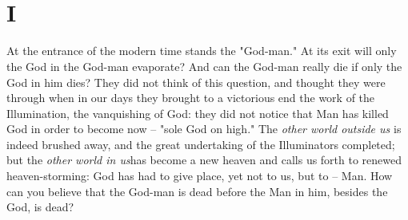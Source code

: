 
\chapter[Part Second: I]{\\
I}

\medskip{}

\noindent{}At the entrance of the modern time stands the "{}God-man."{} At its 
exit will only the God in the God-man evaporate? And can the God-man really 
die if only the God in him dies? They did not think of this question, and 
thought they were through when in our days they brought to a victorious end 
the work of the Illumination, the vanquishing of God: they did not notice that 
Man has killed God in order to become now -- "{}sole God on high."{} The 
\textit{other world outside us} is indeed brushed away, and the great 
undertaking of the Illuminators completed; but the \textit{other world in 
us}has become a new heaven and calls us forth to renewed heaven-storming: God 
has had to give place, yet not to us, but to -- Man. How can you believe that 
the God-man is dead before the Man in him, besides the God, is dead?

\medskip{}
